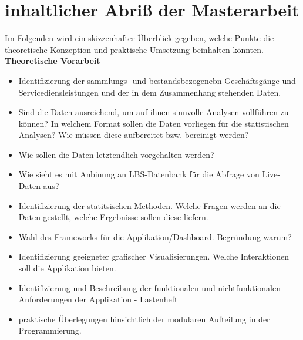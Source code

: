 \documentclass[10pt,a4paper,twocolumn,conference]{IEEEtran}
\begin{document}



\section{inhaltlicher Abriß der Masterarbeit}
Im Folgenden wird ein skizzenhafter Überblick gegeben, welche Punkte die
theoretische Konzeption und praktische Umsetzung beinhalten könnten.\\ 

\textbf{Theoretische Vorarbeit}\\
\begin{itemize}
    \item Identifizierung der sammlungs- und bestandsbezogenebn Geschäftsgänge und Servicediensleistungen und der in dem Zusammenhang stehenden Daten.
    \item Sind die Daten ausreichend, um auf ihnen sinnvolle Analysen vollführen zu
          können? In welchem Format sollen die Daten vorliegen für die statistischen
          Analysen? Wie müssen diese aufbereitet bzw. bereinigt werden?
    \item Wie sollen die Daten letztendlich vorgehalten werden?
    \item Wie sieht es mit Anbinung an LBS-Datenbank für die Abfrage von Live-Daten
          aus?
    \item Identifizierung der statitsischen Methoden. Welche Fragen werden an die Daten
          gestellt, welche Ergebnisse sollen diese liefern.
    \item Wahl des Frameworks für die Applikation/Dashboard. Begründung warum?
    \item Identifizierung geeigneter grafischer Visualisierungen. Welche
          Interaktionen soll die Applikation bieten.
    \item Identifizierung und Beschreibung der funktionalen und nichtfunktionalen
          Anforderungen der Applikation - Lastenheft
    \item praktische Überlegungen hinsichtlich der modularen Aufteilung in der
          Programmierung.\\
\end{itemize}
\end{document}
